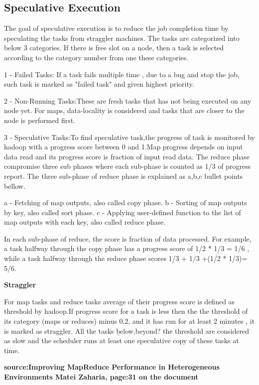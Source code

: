 \subsection{Speculative Execution}

The goal of speculative execution is to reduce the job completion time by speculating the tasks from straggler machines. The tasks are categorized into below 3 categories. If there is free slot on a node, then a task is selected according to the category number from one these categories.  

1 - Failed Tasks: If a task fails multiple time , due to a bug and stop the job, such task is marked as "failed task" and given highest priority. 

2 - Non-Running Tasks:These are fresh tasks that has not being executed on any node yet. For maps, data-locality is considered and tasks that are closer to the node is performed first. 

3 - Speculative Tasks:To find speculative task,the progress of task is monitored by hadoop with a progress score between 0 and 1.Map progress depends on input data read and its progress score is fraction of input read data. The reduce phase compromise three sub phases where each sub-phase is counted as 1/3 of progress report. The three sub-phase of reduce phase is explained as a,b,c bullet points bellow. 

	a - Fetching of map outputs, also called copy phase.
	b - Sorting of map outputs by key, also called sort phase.
	c - Applying user-defined function to the list of map outputs with each key, also called reduce phase. 

In each sub-phase of reduce, the score is fraction of data processed. For example, a task halfway through the copy phase has a progress score of 1/2 * 1/3 = 1/6 , while a task halfway through the reduce phase scores 1/3 + 1/3 +(1/2 * 1/3)= 5/6.

\textbf{Straggler} 

For map tasks and reduce tasks average of their progress score is defined as threshold by hadoop.If progress score for a task is less then the the threshold of its category (maps or reduces) minus 0.2, and it has run for at least 2 minutes , it is marked as straggler. All the tasks \b{below,beyond?} the threshold are considered as slow and the scheduler runs at least one speculative copy of these tasks at time. 
 

\textbf{source:Improving MapReduce Performance in Heterogeneous Environments
Matei Zaharia, page:31 on the document}


